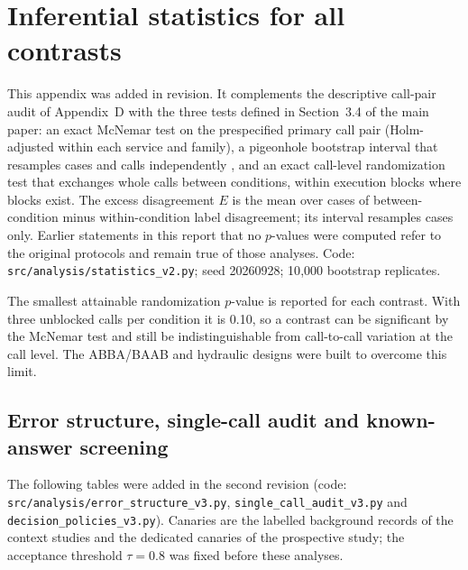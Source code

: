 \documentclass[11pt,a4paper]{article}
\begin{document}
\clearpage
\section{Inferential statistics for all contrasts}\label{app:stats}
This appendix was added in revision. It complements the descriptive call-pair audit of Appendix~D with the three tests defined in Section~3.4 of the main paper: an exact McNemar test on the prespecified primary call pair (Holm-adjusted within each service and family), a pigeonhole bootstrap interval that resamples cases and calls independently \citep{owen2007pigeonhole}, and an exact call-level randomization test that exchanges whole calls between conditions, within execution blocks where blocks exist. The excess disagreement $E$ is the mean over cases of between-condition minus within-condition label disagreement; its interval resamples cases only. Earlier statements in this report that no $p$-values were computed refer to the original protocols and remain true of those analyses. Code: \texttt{src/analysis/statistics\_v2.py}; seed 20260928; 10{,}000 bootstrap replicates.

The smallest attainable randomization $p$-value is reported for each contrast. With three unblocked calls per condition it is 0.10, so a contrast can be significant by the McNemar test and still be indistinguishable from call-to-call variation at the call level. The ABBA/BAAB and hydraulic designs were built to overcome this limit.



\FloatBarrier
\subsection*{Error structure, single-call audit and known-answer screening}
The following tables were added in the second revision (code: \nolinkurl{src/analysis/error_structure_v3.py}, \nolinkurl{single_call_audit_v3.py} and \nolinkurl{decision_policies_v3.py}). Canaries are the labelled background records of the context studies and the dedicated canaries of the prospective study; the acceptance threshold $\tau=0.8$ was fixed before these analyses.



\FloatBarrier
\end{document}
